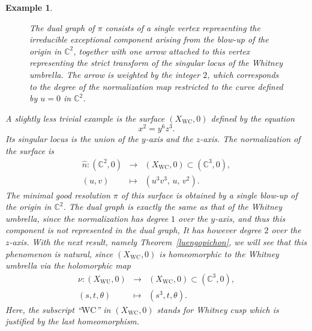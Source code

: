 \documentclass[reqno,dvipsnames,12pt]{amsart}
\newtheorem{exam}[thm]{Example}
\begin{document}
\begin{exam}
\begin{figure}[H]
  \caption{The dual graph of \(\pi\) consists of a single vertex representing the irreducible exceptional component arising from the blow-up of the origin in \(\mathbb{C}^2\), together with one arrow attached to this vertex representing the strict transform of the singular locus of the Whitney umbrella. The arrow is weighted by the integer \(2\), which corresponds to the degree of the normalization map restricted to the curve defined by \(u = 0\) in \(\mathbb{C}^2\).
 }
   \end{figure} 



     A slightly less trivial example is the surface \((X_{\mathrm{WC}},0)\) defined by the equation
\[
x^2 = y^6 z^3.
\]
Its singular locus is the union of the \(y\)-axis and the \(z\)-axis. The normalization of the surface is
\[
\begin{array}{ccc}
\hat{n} \colon (\mathbb{C}^2,0) & \longrightarrow & (X_{\mathrm{WC}} ,0) \subset (\mathbb{C}^3,0), \\
(u,v) & \longmapsto & (u^3 v^3,\, u,\, v^2).
\end{array}
\]
The minimal good resolution \(\pi\) of this surface is obtained by a single blow-up of the origin in \(\mathbb{C}^2\). The dual graph is exactly the same as that of the Whitney umbrella, since the normalization has degree \(1\) over the \(y\)-axis, and thus this component is not represented in the dual graph, It has however degree $2$ over the $z$-axis. With the next result, namely Theorem~\ref{luengopichon}, we will see that this phenomenon is natural, since $(X_{\mathrm{WC}},0)$ is homeomorphic to the Whitney umbrella via the holomorphic map
\[
\begin{array}{ccc}
\nu  \colon (X_{\mathrm{WU}},0) & \longrightarrow & (X_{\mathrm{WC}},0) \subset (\mathbb{C}^3,0), \\
(s,t,\theta) & \longmapsto & (s^3,t,\theta).
\end{array}
\]
Here, the subscript ``$\mathrm{WC}$'' in $(X_{\mathrm{WC}},0)$ stands for \emph{Whitney cusp} which is justified by the last homeomorphism.

\end{exam}
\end{document}
